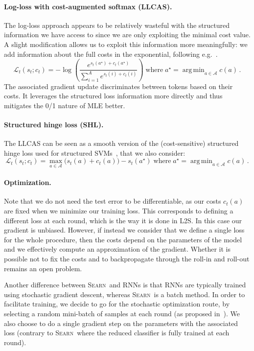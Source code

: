 \documentclass{article}
\newcommand{\SEARN}{\textsc{Searn}}
\DeclareMathOperator*{\argmin}{arg\,min}
\begin{document}
	\paragraph{Log-loss with cost-augmented softmax (LLCAS).}
	The log-loss approach appears to be relatively wasteful with the structured information we have access to since we are only exploiting the minimal cost value.
	A slight modification allows us to exploit this information more meaningfully: we add information about the full costs in the exponential, following e.g.~\citet{pletscher10}.
	\begin{equation}
	\mathcal{L}_t(s_t; c_t) = -\log\left(\frac{e^{s_t(a^\star)+c_t(a^\star)}} {\textstyle\sum_{i=1}^A e^{s_t(i)+c_t(i)}}\right)  \; \text{where} \; a^\star=\argmin_{a \in \mathcal{A}} c(a) \, .
	\end{equation}
	The associated gradient update discriminates between tokens based on their costs.
	It leverages the structured loss information more directly and thus mitigates the 0/1 nature of MLE better.

	\paragraph{Structured hinge loss (SHL).} The LLCAS can be seen as a smooth version of the (cost-sensitive) structured hinge loss used for structured SVMs~\citep{tso05svmstruct}, that we also consider:
	\begin{equation}
	\mathcal{L}_t(s_t; c_t) = \max_{a \in \mathcal{A}} \big(s_t(a) + c_t(a)\big)  - s_t(a^\star) \; \text{where} \; a^\star=\argmin_{a \in \mathcal{A}} c(a) \, .
	\end{equation}


	\paragraph{Optimization.}
	Note that we do not need the test error to be differentiable, as our costs $c_t(a)$ are fixed when we minimize our training loss.
	This corresponds to defining a different loss at each round, which is the way it is done in L2S.
	In this case our gradient is unbiased.
	However, if instead we consider that we define a single loss for the whole procedure, then the costs depend on the parameters of the model and we effectively compute an approximation of the gradient.
	Whether it is possible not to fix the costs and to backpropagate through the roll-in and roll-out remains an open problem.

	Another difference between \SEARN\ and RNNs is that RNNs are typically trained using stochastic gradient descent, whereas \SEARN\ is a batch method.
	In order to facilitate training, we decide to go for the stochastic optimization route, by selecting a random mini-batch of samples at each round (as proposed in~\citet{Chang2015}).
	We also choose to do a single gradient step on the parameters with the associated loss (contrary to \SEARN\ where the reduced classifier is fully trained at each round).
\end{document}
